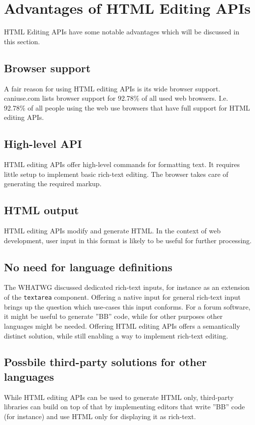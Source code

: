 
\section{Advantages of HTML Editing APIs}
\label{sec:edit_api_adv}

HTML Editing APIs have some notable advantages which will be discussed in this section.

\subsection{Browser support}

A fair reason for using HTML editing APIs is its wide browser support. caniuse.com lists browser support for 92.78\% of all used web browsers\cite{caniuse_contenteditable}. I.e. 92.78\% of all people using the web use browsers that have full support for HTML editing APIs.


\subsection{High-level API}

HTML editing APIs offer high-level commands for formatting text. It requires little setup to implement basic rich-text editing. The browser takes care of generating the required markup.

\subsection{HTML output}

HTML editing APIs modify and generate HTML. In the context of web development, user input in this format is likely to be useful for further processing.

\subsection{No need for language definitions}

The WHATWG discussed dedicated rich-text inputs, for instance as an extension of the \texttt{textarea} component. Offering a native input for general rich-text input brings up the question which use-cases this input conforms. For a forum software, it might be useful to generate ''BB'' code, while for other purposes other languages might be needed. Offering HTML editing APIs offers a semantically distinct solution, while still enabling a way to implement rich-text editing. %

\subsection{Possbile third-party solutions for other languages}

While HTML editing APIs can be used to generate HTML only, third-party libraries can build on top of that by implementing editors that write ''BB'' code (for instance) and use HTML only for displaying it as rich-text.